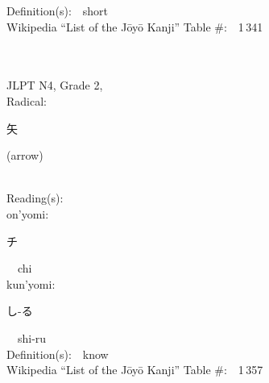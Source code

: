 \begin{multicols}{2}
Definition(s):\ \ short \\
Wikipedia ``List of the J\=oy\=o Kanji'' Table \#:\ \ 1\,341 \\
\ \ \\
{\fontsize{34pt}{40pt}  }\ \ \\  %
{JLPT N4, Grade 2, \\Radical:\ \ {\begin{CJK}{UTF8}{min} 矢 \end{CJK}} (arrow) } \\
Reading(s):\ \ \\
{\hspace*{1em}}on'yomi:\ \ \\
{\hspace*{2em}}{\begin{CJK}{UTF8}{min} チ \end{CJK}}\ \ chi\ \ \\
{\hspace*{1em}}kun'yomi:\ \ \\
{\hspace*{2em}}{\begin{CJK}{UTF8}{min} し-る \end{CJK}}\ \ shi-ru\ \ \\
Definition(s):\ \ know \\
Wikipedia ``List of the J\=oy\=o Kanji'' Table \#:\ \ 1\,357 \\
\ \ \\
\end{multicols}



